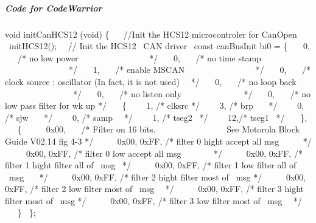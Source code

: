 \documentclass[12pt,twoside]{article}
\begin{document}
\subparagraph{Code for CodeWarrior}
{\ttfamily
void initCanHCS12 (void)\newline
 \{ \ \newline
  \ //Init the HCS12 microcontroler for CanOpen \newline
  \ initHCS12();\newline
  \ \ // Init the HCS12 \ CAN driver\newline
  \ const canBusInit bi0 = \{\newline
  \ \ \ 0, \ \ \ /* no low power \ \ \ \ \ \ \ \ \ \ \ \ \ \ \ \ */
\newline
  \ \ \ 0, \ \ \ /* no time stamp
\ \ \ \ \ \ \ \ \ \ \ \ \ \ \ */\newline
  \ \ \ 1, \ \ \ /* enable MSCAN
\ \ \ \ \ \ \ \ \ \ \ \ \ \ \ \ */\newline
  \ \ \ 0, \ \ \ /* clock source : oscillator (In fact, it is not used)
\ \ */\newline
  \ \ \ 0, \ \ \ /* no loop back
\ \ \ \ \ \ \ \ \ \ \ \ \ \ \ \ */\newline
  \ \ \ 0, \ \ \ /* no listen only
\ \ \ \ \ \ \ \ \ \ \ \ \ \ */\newline
  \ \ \ 0, \ \ \ /* no low pass filter for wk up */\newline
  \ \ \ \{\newline
  \ \ \ \ 1, /* clksrc */\newline
  \ \ \ \ 3, /* brp \ \ \ */\newline
  \ \ \ \ 0, /* sjw \ \ \ */\newline
  \ \ \ \ 0, /* samp \ \ */\newline
  \ \ \ \ 1, /* tseg2 \ */\newline
  \ \ \ \ 12,/* tseg1 \ */\newline
  \ \ \ \},\newline
  \ \ \ \{\newline
  \ \ \ \ \ 0x00, \ \ \ /* Filter on 16 bits.\newline
  \ \ \ \ \ \ \ \ \ \ \ \ \ \ \ \ See Motorola Block Guide V02.14 fig
4{}-3 */\newline
  \ \ \ \ \ 0x00, 0xFF, /* filter 0 hight accept all msg
\ \ \ \ \ */\newline
  \ \ \ \ \ 0x00, 0xFF, /* filter 0 low accept all msg
\ \ \ \ \ \ \ */\newline
  \ \ \ \ \ 0x00, 0xFF, /* filter 1 hight filter all of \ msg
\ */\newline
  \ \ \ \ \ 0x00, 0xFF, /* filter 1 low filter all of \ msg
\ \ \ */\newline
  \ \ \ \ \ 0x00, 0xFF, /* filter 2 hight filter most of \ msg
*/\newline
  \ \ \ \ \ 0x00, 0xFF, /* filter 2 low filter most of \ msg
\ \ */\newline
  \ \ \ \ \ 0x00, 0xFF, /* filter 3 hight filter most of \ msg
*/\newline
  \ \ \ \ \ 0x00, 0xFF, /* filter 3 low filter most of \ msg
\ \ */\newline
  \ \ \ \}\newline
  \ \};}
\end{document}
